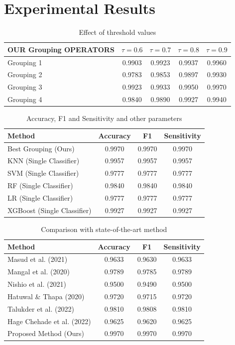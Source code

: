 \documentclass[a4paper,12pt]{article}
\begin{document}
\section{Experimental Results}

\begin{table}[h]
\centering
\caption{Effect of threshold values}
\begin{tabular}{|l|c|c|c|c|}
\hline
\textbf{OUR Grouping OPERATORS} & $\tau = 0.6$ & $\tau = 0.7$ & $\tau = 0.8$ & $\tau = 0.9$ \\
\hline
Grouping 1 & 0.9903 & 0.9923 & 0.9937 & 0.9960 \\
Grouping 2 & 0.9783 & 0.9853 & 0.9897 & 0.9930 \\
Grouping 3 & 0.9923 & 0.9933 & 0.9950 & 0.9970 \\
Grouping 4 & 0.9840 & 0.9890 & 0.9927 & 0.9940 \\
\hline
\end{tabular}
\end{table}

\begin{table}[h]
\centering
\caption{Accuracy, F1 and Sensitivity and other parameters}
\begin{tabular}{|l|c|c|c|}
\hline
\textbf{Method} & \textbf{Accuracy} & \textbf{F1} & \textbf{Sensitivity} \\
\hline
Best Grouping (Ours) & 0.9970 & 0.9970 & 0.9970 \\
KNN (Single Classifier) & 0.9957 & 0.9957 & 0.9957 \\
SVM (Single Classifier) & 0.9777 & 0.9777 & 0.9777 \\
RF (Single Classifier) & 0.9840 & 0.9840 & 0.9840 \\
LR (Single Classifier) & 0.9777 & 0.9777 & 0.9777 \\
XGBoost (Single Classifier) & 0.9927 & 0.9927 & 0.9927 \\
\hline
\end{tabular}
\end{table}

\begin{table}[h]
\centering
\caption{Comparison with state-of-the-art method}
\begin{tabular}{|l|c|c|c|}
\hline
\textbf{Method} & \textbf{Accuracy} & \textbf{F1} & \textbf{Sensitivity} \\
\hline
Masud et al. (2021) & 0.9633 & 0.9630 & 0.9633 \\
Mangal et al. (2020) & 0.9789 & 0.9785 & 0.9789 \\
Nishio et al. (2021) & 0.9500 & 0.9490 & 0.9500 \\
Hatuwal \& Thapa (2020) & 0.9720 & 0.9715 & 0.9720 \\
Talukder et al. (2022) & 0.9810 & 0.9808 & 0.9810 \\
Hage Chehade et al. (2022) & 0.9625 & 0.9620 & 0.9625 \\
Proposed Method (Ours) & 0.9970 & 0.9970 & 0.9970 \\
\hline
\end{tabular}
\end{table}
\end{document}
